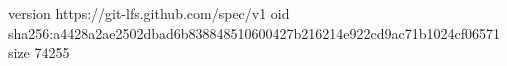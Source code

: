 version https://git-lfs.github.com/spec/v1
oid sha256:a4428a2ae2502dbad6b838848510600427b216214e922cd9ac71b1024cf06571
size 74255
